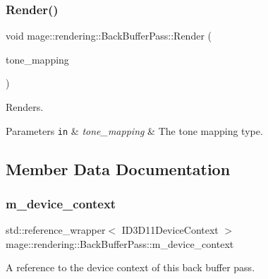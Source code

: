 \subsubsection{\texorpdfstring{Render()}{Render()}}
{\footnotesize\ttfamily void mage\+::rendering\+::\+Back\+Buffer\+Pass\+::\+Render (\begin{DoxyParamCaption}\item[{\hyperlink{namespacemage_1_1rendering_a789e4b7d9a8cc831b065e9c6bb7430e9}{Tone\+Mapping}}]{tone\+\_\+mapping }\end{DoxyParamCaption})}

Renders.


\begin{DoxyParams}[1]{Parameters}
\mbox{\tt in}  & {\em tone\+\_\+mapping} & The tone mapping type. \\
\hline
\end{DoxyParams}


\subsection{Member Data Documentation}
\hypertarget{classmage_1_1rendering_1_1_back_buffer_pass_ae87c0cf8b2ffe627ac44faaf61791b4f}{}\label{classmage_1_1rendering_1_1_back_buffer_pass_ae87c0cf8b2ffe627ac44faaf61791b4f} 
\subsubsection{\texorpdfstring{m\+\_\+device\+\_\+context}{m\_device\_context}}
{\footnotesize\ttfamily std\+::reference\+\_\+wrapper$<$ I\+D3\+D11\+Device\+Context $>$ mage\+::rendering\+::\+Back\+Buffer\+Pass\+::m\+\_\+device\+\_\+context\hspace{0.3cm}{\ttfamily [private]}}

A reference to the device context of this back buffer pass. \hypertarget{classmage_1_1rendering_1_1_back_buffer_pass_ac13f6af3893cec667d6ab1b0da7b2a94}{}\label{classmage_1_1rendering_1_1_back_buffer_pass_ac13f6af3893cec667d6ab1b0da7b2a94} 

